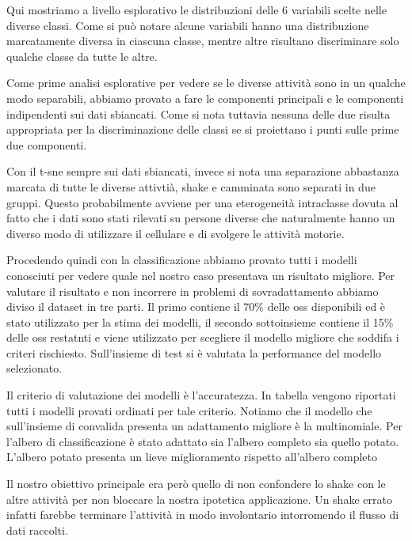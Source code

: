 %
Qui mostriamo a livello esplorativo le distribuzioni delle 6 variabili scelte nelle diverse classi. Come si può notare alcune variabili hanno una distribuzione marcatamente diversa in ciascuna classe, mentre altre risultano discriminare solo qualche classe da tutte le altre.
%

%
Come prime analisi esplorative per vedere se le diverse attività sono in un qualche modo separabili, abbiamo provato a fare le componenti principali e le componenti indipendenti sui dati sbiancati. Come si nota tuttavia nessuna delle due risulta appropriata per la discriminazione delle classi se si proiettano i punti sulle prime due componenti.
%

%
Con il t-sne sempre sui dati sbiancati, invece si nota una separazione abbastanza marcata di tutte le diverse attivtià, shake e camminata sono separati in due gruppi. Questo probabilmente avviene per una eterogeneità intraclasse dovuta al fatto che i dati sono stati rilevati su persone diverse che naturalmente hanno un diverso modo di utilizzare il cellulare e di svolgere le attività motorie. 
%

%
Procedendo quindi con la classificazione abbiamo provato tutti i modelli conosciuti per vedere quale nel nostro caso presentava un risultato migliore. Per valutare il risultato e non incorrere in problemi di sovradattamento abbiamo diviso il dataset in tre parti. Il primo contiene il 70\% delle oss disponibili ed è stato utilizzato per la stima dei modelli, il secondo sottoinsieme contiene il 15\% delle oss restatnti e viene utilizzato per scegliere il modello migliore che soddifa  i criteri rischiesto. Sull'insieme di test si è valutata la performance del modello selezionato. 
%

%
Il criterio di valutazione dei modelli è l'accuratezza. In tabella vengono riportati tutti i modelli provati ordinati per tale criterio. Notiamo che il modello che sull'insieme di convalida presenta un adattamento migliore è la multinomiale. Per l'albero di classificazione è stato adattato sia l'albero completo sia quello potato. L'albero potato presenta un lieve miglioramento rispetto all'albero completo
%

%
Il nostro obiettivo principale era però quello di non confondere lo shake con le altre attività per non bloccare la nostra ipotetica applicazione. Un shake errato infatti farebbe terminare l\rq{}attività in modo involontario intorromendo il flusso di dati raccolti.
%

